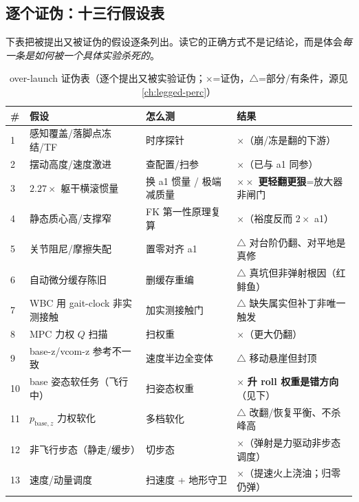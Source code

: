 \subsection{逐个证伪：十三行假设表}
\label{subsec:ld-ol-table}

下表把被提出又被证伪的假设逐条列出。读它的正确方式不是记结论，而是体会\emph{每一条是如何被一个具体实验杀死的}。

\begin{table}[H]\centering\small
\caption{over-launch 证伪表（逐个提出又被实验证伪；$\times$=证伪，$\triangle$=部分/有条件，源见 \cref{ch:legged-perc}）}
\begin{tabular}{p{} p{} p{} p{}}
\toprule
\# & 假设 & 怎么测 & 结果 \\
\midrule
1 & 感知覆盖/落脚点冻结/TF & 时序探针 & $\times$（崩/冻是翻的下游）\\
2 & 摆动高度/速度激进 & 查配置/扫参 & $\times$（已与 a1 同参）\\
3 & $2.27\times$ 躯干横滚惯量 & 换 a1 惯量 / 极端减质量 & $\times\times$ \textbf{更轻翻更狠}=放大器非闸门 \\
4 & 静态质心高/支撑窄 & FK 第一性原理复算 & $\times$（裕度反而 $2\times$ a1）\\
5 & 关节阻尼/摩擦失配 & 置零对齐 a1 & $\triangle$ 对台阶仍翻、对平地是真修 \\
6 & 自动微分缓存陈旧 & 删缓存重编 & $\triangle$ 真坑但非弹射根因（红鲱鱼）\\
7 & WBC 用 gait-clock 非实测接触 & 加实测接触门 & $\triangle$ 缺失属实但补丁非唯一触发 \\
8 & MPC 力权 $Q$ 扫描 & 扫权重 & $\times$（更大仍翻）\\
9 & base-z/vcom-z 参考不一致 & 速度半边全变体 & $\triangle$ 移动悬崖但封顶 \\
10 & base 姿态软任务（飞行中）& 扫姿态权重 & $\times$ \textbf{升 roll 权重是错方向}（见下）\\
11 & $p_{\text{base},z}$ 力权软化 & 多档软化 & $\triangle$ 改翻/恢复平衡、不杀峰高 \\
12 & 非飞行步态（静走/缓步）& 切步态 & $\times$（弹射是力驱动非步态调度）\\
13 & 速度/动量调度 & 扫速度 + 地形守卫 & $\times$（提速火上浇油；归零仍弹）\\
\bottomrule
\end{tabular}
\label{tab:ld-overlaunch}
\end{table}

